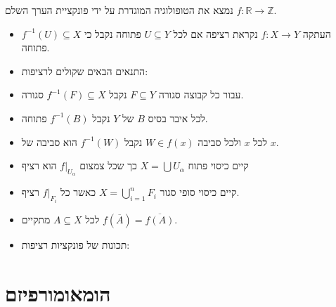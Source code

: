 \documentclass{tstextbook}
\begin{document}
\begin{example}
נמצא את הטופולוגיה המוגדרת על ידי פונקציית הערך השלם \(f:\mathbb{R}\to \mathbb{Z}\).

\end{example}
\begin{summary}
  \begin{itemize}
    \item העתקה \(f:X\to Y\) נקראת רציפה אם לכל \(U \subseteq Y\) פתוחה נקבל כי \(f^{-1}(U)\subseteq X\) פתוחה.
    \item התנאים הבאים שקולים לרציפות:


    \item עבור כל קבוצה סגורה \(F \subseteq Y\) נקבל \(f^{-1}(F)\subseteq X\) סגורה. 


    \item לכל איבר בסיס \(B\) של \(Y\) נקבל \(f^{-1}(B)\) פתוחה. 


    \item לכל \(x\) ולכל סביבה \(W\in f(x)\) נקבל \(f^{-1}(W)\) הוא סביבה של \(x\). 


    \item קיים כיסוי פתוח \(X=\bigcup U_{\alpha}\) כך שכל צמצום \(f|_{U_{\alpha}}\) הוא רציף 


    \item קיים כיסוי סופי סגור \(X=\bigcup_{i=1}^{n}F_{i}\) כאשר כל \(f|_{F_{i}}\) רציף. 


    \item לכל \(A\subseteq X\) מתקיים \(f\left( \overline{A} \right)=\overline{f(A)}\). 


    \item תכונות של פונקציות רציפות:
  \end{itemize}
\end{summary}
\section{הומאומורפיזם}
\end{document}
